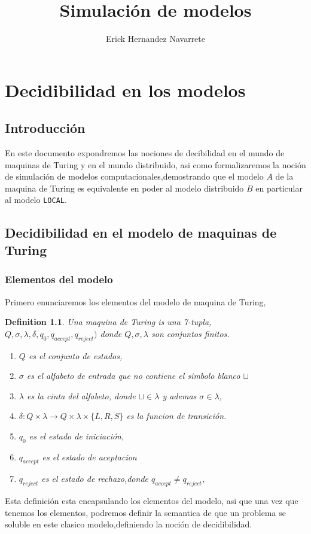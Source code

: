 \documentclass[10pt]{report}
\author{Erick Hernandez Navarrete}
\title{Simulación de modelos}
\newtheorem{definition}{Definition}
\begin{document}
    \maketitle
    \tableofcontents{}
    \chapter{Decidibilidad en los modelos}\label{ch:decidibilidad-en-los-modelos}
    \section{Introducción}\label{sec:introducción}
    En este documento expondremos las nociones de decibilidad
    en el mundo de maquinas de Turing y en el mundo distribuido,
    asi como formalizaremos la noción de simulación de modelos
    computacionales,demostrando que el modelo $A$ de  la maquina de
    Turing es equivalente en poder al modelo distribuido $B$ en particular al modelo \texttt{LOCAL}.

    \section{Decidibilidad en el modelo de maquinas de Turing}\label{sec:decidibilidasd-en-el-modelo-de-maquinas-de-turing}
    \subsection{Elementos del modelo}\label{subsec:elementos-del-modelo-de-maquina-de-turing}
    Primero enunciaremos los elementos del modelo de maquina de Turing,
    \begin{definition}
        Una maquina de Turing is una 7-tupla, $Q,\sigma,\lambda,\delta,q_{0},q_{accept},q_{reject})$
        donde $Q,\sigma,\lambda$ son conjuntos finitos.
        \begin{enumerate}
            \item $Q$ es el conjunto de estados,
            \item $\sigma$ es el alfabeto de entrada que no contiene el simbolo blanco $\sqcup$
            \item $\lambda$ es la cinta del alfabeto, donde  $\sqcup\in\lambda$ y ademas $\sigma\in\lambda$,
            \item $\delta: Q\times\lambda \rightarrow Q\times\lambda\times\{L,R,S\}$ es la funcion de transición.
            \item $q_{0}$ es el estado de iniciación,
            \item $q_{accept}$ es el estado de aceptacion
            \item $q_{reject}$ es el estado de rechazo,donde $q_{accept} \neq q_{reject}$,

        \end{enumerate}

    \end{definition}
    Esta definición esta encapsulando los elementos del modelo,
    asi que una vez que tenemos los elementos, podremos definir la semantica
    de que un problema se soluble en este clasico modelo,definiendo
    la noción de decidibilidad.
    \space
\end{document}
